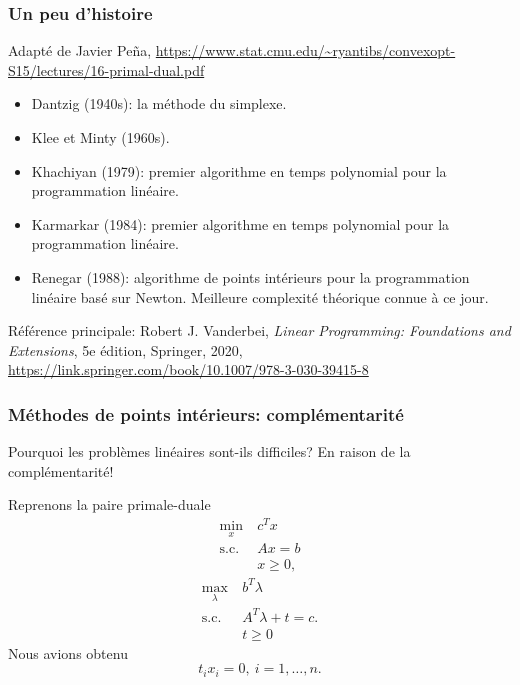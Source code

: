 \documentclass[t, aspectratio=169,usepdftitle=false]{beamer}
\begin{document}
\begin{frame}
\frametitle{Un peu d'histoire}

Adapté de Javier Peña, \url{https://www.stat.cmu.edu/~ryantibs/convexopt-S15/lectures/16-primal-dual.pdf}
\begin{itemize}
\item 
Dantzig (1940s): la méthode du simplexe.
\item
Klee et Minty (1960s).
\item 
Khachiyan (1979): premier algorithme en temps polynomial pour la programmation linéaire.
\item
Karmarkar (1984): premier algorithme en temps polynomial pour la programmation linéaire.
\item 
Renegar (1988): algorithme de points intérieurs pour la programmation linéaire basé sur Newton. Meilleure complexité théorique connue à ce jour.
\end{itemize}

Référence principale: Robert J. Vanderbei, \textit{Linear
Programming: Foundations and Extensions}, 5e édition, Springer, 2020, \url{https://link.springer.com/book/10.1007/978-3-030-39415-8}

\end{frame}

\begin{frame}
\frametitle{Méthodes de points intérieurs: complémentarité}

Pourquoi les problèmes linéaires sont-ils difficiles? En raison de la complémentarité!

\mbox{}

Reprenons la paire primale-duale
\begin{align*}
\min_x\ & c^T x \\
\mbox{s.c. } & Ax = b \\
& x \geq 0,
\end{align*}
\begin{align*}
\max_{\lambda} \  & b^T \lambda \\
\mbox{s.c. } & A^T \lambda  +t = c. \\
& t \geq 0
\end{align*}
Nous avions obtenu
\[
t_i x_i = 0, \ i = 1,\ldots, n.
\]

\end{frame}
\end{document}
